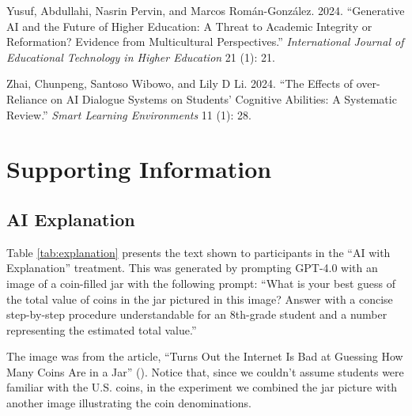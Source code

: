 \documentclass[
  12pt,
]{article}
\newlength{\cslhangindent}
\newenvironment{CSLReferences}[2] %
 {\begin{list}{}{%
  \setlength{\itemindent}{0pt}
  \setlength{\leftmargin}{0pt}
  \setlength{\parsep}{0pt}
  \ifodd #1
   \setlength{\leftmargin}{\cslhangindent}
   \setlength{\itemindent}{-1\cslhangindent}
  \fi
  \setlength{\itemsep}{#2\baselineskip}}}
 {\end{list}}
\begin{document}
\begin{CSLReferences}{1}{0}
Yusuf, Abdullahi, Nasrin Pervin, and Marcos Román-González. 2024. {``Generative AI and the Future of Higher Education: A Threat to Academic Integrity or Reformation? Evidence from Multicultural Perspectives.''} \emph{International Journal of Educational Technology in Higher Education} 21 (1): 21.

Zhai, Chunpeng, Santoso Wibowo, and Lily D Li. 2024. {``The Effects of over-Reliance on AI Dialogue Systems on Students' Cognitive Abilities: A Systematic Review.''} \emph{Smart Learning Environments} 11 (1): 28.

\end{CSLReferences}

\clearpage
\processdelayedfloats
\clearpage
\appendix
\setcounter{table}{0}
\setcounter{figure}{0}
\renewcommand{\thetable}{A\arabic{table}}
\renewcommand{\thefigure}{A\arabic{figure}}

\section{Supporting Information}\label{supporting-information}

\subsection{AI Explanation}\label{sec:si-ai-explanation}

Table \ref{tab:explanation} presents the text shown to participants in the ``AI with Explanation'' treatment. This was generated by prompting GPT-4.0 with an image of a coin-filled jar with the following prompt: ``What is your best guess of the total value of coins in the jar pictured in this image? Answer with a concise step-by-step procedure understandable for an 8th-grade student and a number representing the estimated total value.''

The image was from the article, ``Turns Out the Internet Is Bad at Guessing How Many Coins Are in a Jar'' (). Notice that, since we couldn't assume students were familiar with the U.S. coins, in the experiment we combined the jar picture with another image illustrating the coin denominations.
\end{document}
